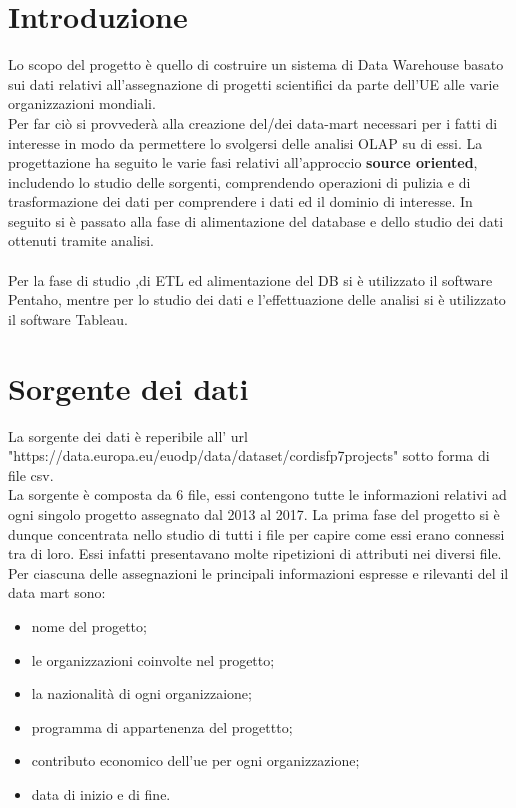 \documentclass[12pt,a4paper]{report}
\begin{document}
	\begin{titlepage}
		
	\end{titlepage}
	\section*{Introduzione}
	Lo scopo del progetto è quello di costruire un sistema di Data Warehouse basato sui dati relativi all'assegnazione di progetti scientifici da parte dell'UE alle varie organizzazioni mondiali.\\\noindent
	Per far ciò si provvederà alla creazione del/dei data-mart necessari per i fatti di interesse in modo da permettere lo svolgersi delle analisi OLAP su di essi.
	La progettazione ha seguito le varie fasi relativi all'approccio \textbf{source oriented}, includendo lo studio delle sorgenti, comprendendo operazioni di pulizia e di trasformazione dei dati per comprendere i dati ed il dominio di interesse. In seguito si è passato alla fase di alimentazione del database e dello studio dei dati ottenuti tramite analisi.\\\\\noindent
	Per la fase di studio ,di ETL ed alimentazione del DB si è utilizzato il software Pentaho, mentre per lo studio dei dati e l'effettuazione delle analisi si è utilizzato il software Tableau.
	\section*{Sorgente dei dati}
	La sorgente dei dati è reperibile all' url  "https://data.europa.eu/euodp/data/dataset/cordisfp7projects" sotto forma di file csv.\\\noindent
	La sorgente è composta da 6 file, essi contengono tutte le informazioni relativi ad ogni singolo progetto assegnato dal 2013 al 2017. La prima fase del progetto si è dunque concentrata nello studio di tutti i file per capire come essi erano connessi tra di loro. Essi infatti presentavano molte ripetizioni di attributi nei diversi file.
	Per ciascuna delle assegnazioni le principali informazioni espresse e rilevanti del il data mart sono:
	\begin{itemize}
		\item nome del progetto;
		\item le organizzazioni coinvolte nel progetto;
		\item la nazionalità di ogni organizzaione;
		\item programma di appartenenza del progettto;
		\item contributo economico dell'ue per ogni organizzazione;
		\item data di inizio e di fine.
	\end{itemize}
\end{document}
